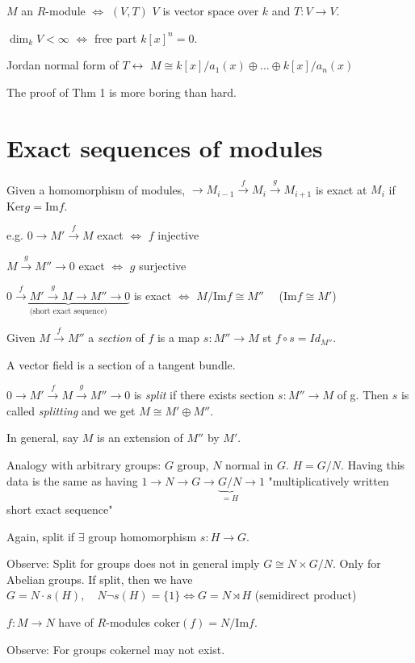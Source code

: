 \documentclass{./template}
\newcommand{\Ker}{\textrm{Ker}}
\newcommand{\Img}{\textrm{Im}}
\newcommand{\coker}{\textrm{coker}}
\begin{document}
  $M$ an $R$-module $\Leftrightarrow$ $(V,T)$ $V$ is vector space over $k$ and $T : V\to V$.
  
  $\dim_k V < \infty$ $\iff$ free part $k[x]^n=0$.
  
  Jordan normal form of $T \leftrightarrow$ $M\cong k[x]/a_1(x)\oplus\ldots\oplus k[x]/a_n(x)$

  The proof of Thm 1 is more boring than hard.

  \section{Exact sequences of modules}

  Given a homomorphism of modules, $\to M_{i-1}\xrightarrow f M_i \xrightarrow g M_{i+1}$ is exact at $M_i$ if $\Ker g = \Img f$.

  e.g. $0 \to M' \xrightarrow f M$ exact $\iff$ $f$ injective
  
  $M \xrightarrow g M'' \to 0$ exact $\iff$ $g$ surjective
  
  $\underbrace{0 \xrightarrow f M'\xrightarrow g M \to M'' \to 0}_\text{(short exact sequence)}$ is exact $\iff$ $M/\Img f \cong M''\quad$ ($\Img f \cong M'$)

  Given $M \xrightarrow f M''$ a {\em section} of $f$ is a map $s:M''\to M$ st $f\circ s = Id_{M''}$. 

  {\ex A vector field is a section of a tangent bundle.}

  $0\to M' \xrightarrow f M \xrightarrow g M'' \to 0$ is {\em split} if there exists section $s:M''\to M$ of g. Then $s$ is called {\em splitting} and we get $M\cong M' \oplus M''$.

  In general, say $M$ is an extension of $M''$ by $M'$.

  Analogy with arbitrary groups: $G$ group, $N$ normal in $G$. $H=G/N$. Having this data is the same as having $1 \to N \to G \to \underbrace{G/N}_{=H} \to 1$ "multiplicatively written short exact sequence"

  Again, split if $\exists$ group homomorphism $s: H\to G$.

  Observe: Split for groups does not in general imply $G\cong N\times G/N$. Only for Abelian groups. If split, then we have $G=N\cdot s(H),\quad N\neg s(H)=\{1\} \iff G=N \rtimes H$ (semidirect product)

  $f:M\to N$ have of $R$-modules $\coker(f)=N/\Img f$.

  Observe: For groups cokernel may not exist.
\end{document}
